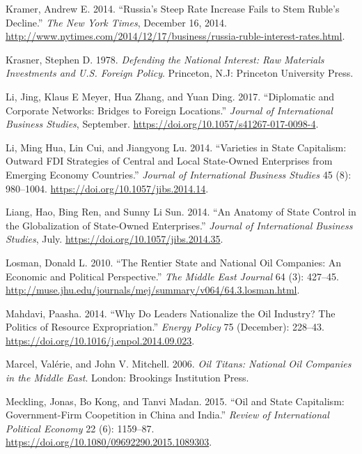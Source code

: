 \documentclass[11pt,]{book}
\begin{document}
\leavevmode\hypertarget{ref-kramer_russias_2014}{}%
Kramer, Andrew E. 2014. ``Russia's Steep Rate Increase Fails to Stem Ruble's Decline.'' \emph{The New York Times}, December 16, 2014. \url{http://www.nytimes.com/2014/12/17/business/russia-ruble-interest-rates.html}.

\leavevmode\hypertarget{ref-krasner_defending_1978}{}%
Krasner, Stephen D. 1978. \emph{Defending the National Interest: Raw Materials Investments and U.S. Foreign Policy}. Princeton, N.J: Princeton University Press.

\leavevmode\hypertarget{ref-li_diplomatic_2017}{}%
Li, Jing, Klaus E Meyer, Hua Zhang, and Yuan Ding. 2017. ``Diplomatic and Corporate Networks: Bridges to Foreign Locations.'' \emph{Journal of International Business Studies}, September. \url{https://doi.org/10.1057/s41267-017-0098-4}.

\leavevmode\hypertarget{ref-li_varieties_2014}{}%
Li, Ming Hua, Lin Cui, and Jiangyong Lu. 2014. ``Varieties in State Capitalism: Outward FDI Strategies of Central and Local State-Owned Enterprises from Emerging Economy Countries.'' \emph{Journal of International Business Studies} 45 (8): 980--1004. \url{https://doi.org/10.1057/jibs.2014.14}.

\leavevmode\hypertarget{ref-liang_anatomy_2014}{}%
Liang, Hao, Bing Ren, and Sunny Li Sun. 2014. ``An Anatomy of State Control in the Globalization of State-Owned Enterprises.'' \emph{Journal of International Business Studies}, July. \url{https://doi.org/10.1057/jibs.2014.35}.

\leavevmode\hypertarget{ref-losman_rentier_2010}{}%
Losman, Donald L. 2010. ``The Rentier State and National Oil Companies: An Economic and Political Perspective.'' \emph{The Middle East Journal} 64 (3): 427--45. \url{http://muse.jhu.edu/journals/mej/summary/v064/64.3.losman.html}.

\leavevmode\hypertarget{ref-mahdavi_why_2014}{}%
Mahdavi, Paasha. 2014. ``Why Do Leaders Nationalize the Oil Industry? The Politics of Resource Expropriation.'' \emph{Energy Policy} 75 (December): 228--43. \url{https://doi.org/10.1016/j.enpol.2014.09.023}.

\leavevmode\hypertarget{ref-marcel_oil_2006}{}%
Marcel, Valérie, and John V. Mitchell. 2006. \emph{Oil Titans: National Oil Companies in the Middle East}. London: Brookings Institution Press.

\leavevmode\hypertarget{ref-meckling_oil_2015}{}%
Meckling, Jonas, Bo Kong, and Tanvi Madan. 2015. ``Oil and State Capitalism: Government-Firm Coopetition in China and India.'' \emph{Review of International Political Economy} 22 (6): 1159--87. \url{https://doi.org/10.1080/09692290.2015.1089303}.
\end{document}

